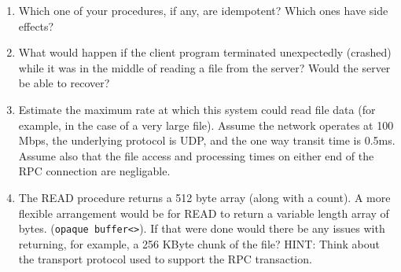 \documentclass[twocolumn]{article}
\begin{document}
\begin{enumerate}

\item Which one of your procedures, if any, are idempotent? Which ones have side effects?

\item What would happen if the client program terminated unexpectedly (crashed) while it was in
  the middle of reading a file from the server? Would the server be able to recover?

\item Estimate the maximum rate at which this system could read file data (for example, in the
  case of a very large file). Assume the network operates at 100 Mbps, the underlying protocol
  is UDP, and the one way transit time is 0.5ms. Assume also that the file access and processing
  times on either end of the RPC connection are negligable.

\item The READ procedure returns a 512 byte array (along with a count). A more flexible
  arrangement would be for READ to return a variable length array of bytes. (\texttt{opaque
    buffer<>}). If that were done would there be any issues with returning, for example, a 256
  KByte chunk of the file? HINT: Think about the transport protocol used to support the RPC
  transaction.

\end{enumerate}
\end{document}
